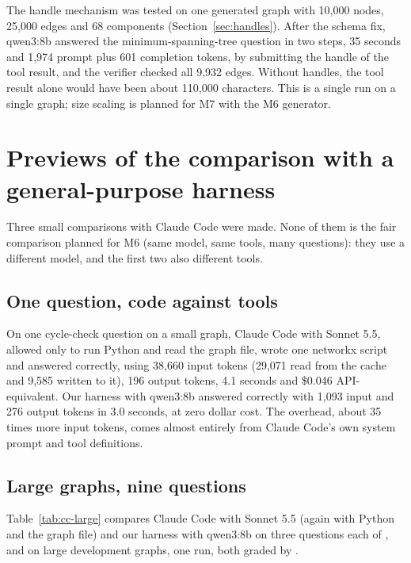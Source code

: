 The handle mechanism was tested on one generated graph with 10,000 nodes, 25,000 edges and 68 components
(Section~\ref{sec:handles}). After the schema fix, qwen3:8b answered the minimum-spanning-tree question in two steps,
35 seconds and 1,974 prompt plus 601 completion tokens, by submitting the handle of the tool result, and the verifier
checked all 9,932 edges. Without handles, the tool result alone would have been about 110,000 characters. This is a
single run on a single graph; size scaling is planned for M7 with the M6 generator.

\section{Previews of the comparison with a general-purpose harness}

Three small comparisons with Claude Code were made. None of them is the fair comparison planned for M6 (same model,
same tools, many questions): they use a different model, and the first two also different tools.

\subsection{One question, code against tools}

On one cycle-check question on a small graph, Claude Code with Sonnet 5.5, allowed only to run Python and read the
graph file, wrote one networkx script and answered correctly, using 38,660 input tokens (29,071 read from the cache and
9,585 written to it), 196 output tokens, 4.1 seconds and \$0.046 API-equivalent. Our harness with qwen3:8b answered
correctly with 1,093 input and 276 output tokens in 3.0 seconds, at zero dollar cost. The overhead, about 35 times more
input tokens, comes almost entirely from Claude Code's own system prompt and tool definitions.

\subsection{Large graphs, nine questions}

Table~\ref{tab:cc-large} compares Claude Code with Sonnet 5.5 (again with Python and the graph file) and our harness
with qwen3:8b on three questions each of ,  and  on large development
graphs, one run, both graded by .

